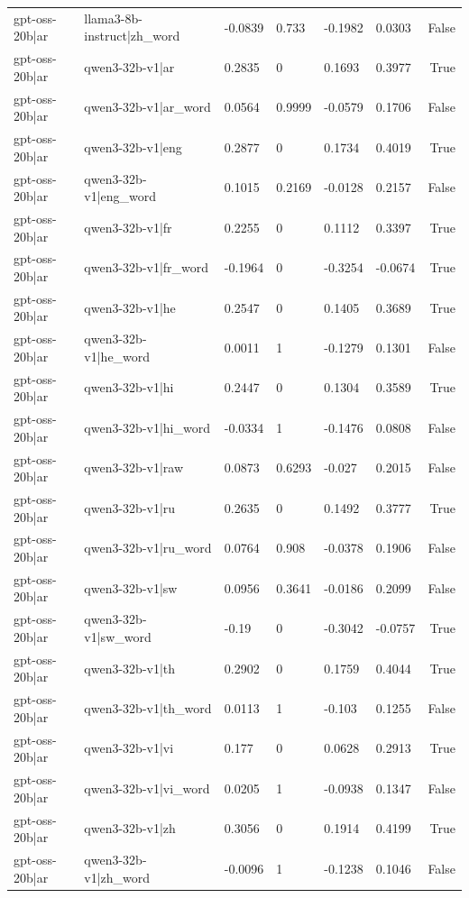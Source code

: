 \begin{table}
\begin{tabular}{llllllr}
gpt-oss-20b|ar & llama3-8b-instruct|zh_word & -0.0839 & 0.733 & -0.1982 & 0.0303 & False \\
gpt-oss-20b|ar & qwen3-32b-v1|ar & 0.2835 & 0 & 0.1693 & 0.3977 & True \\
gpt-oss-20b|ar & qwen3-32b-v1|ar_word & 0.0564 & 0.9999 & -0.0579 & 0.1706 & False \\
gpt-oss-20b|ar & qwen3-32b-v1|eng & 0.2877 & 0 & 0.1734 & 0.4019 & True \\
gpt-oss-20b|ar & qwen3-32b-v1|eng_word & 0.1015 & 0.2169 & -0.0128 & 0.2157 & False \\
gpt-oss-20b|ar & qwen3-32b-v1|fr & 0.2255 & 0 & 0.1112 & 0.3397 & True \\
gpt-oss-20b|ar & qwen3-32b-v1|fr_word & -0.1964 & 0 & -0.3254 & -0.0674 & True \\
gpt-oss-20b|ar & qwen3-32b-v1|he & 0.2547 & 0 & 0.1405 & 0.3689 & True \\
gpt-oss-20b|ar & qwen3-32b-v1|he_word & 0.0011 & 1 & -0.1279 & 0.1301 & False \\
gpt-oss-20b|ar & qwen3-32b-v1|hi & 0.2447 & 0 & 0.1304 & 0.3589 & True \\
gpt-oss-20b|ar & qwen3-32b-v1|hi_word & -0.0334 & 1 & -0.1476 & 0.0808 & False \\
gpt-oss-20b|ar & qwen3-32b-v1|raw & 0.0873 & 0.6293 & -0.027 & 0.2015 & False \\
gpt-oss-20b|ar & qwen3-32b-v1|ru & 0.2635 & 0 & 0.1492 & 0.3777 & True \\
gpt-oss-20b|ar & qwen3-32b-v1|ru_word & 0.0764 & 0.908 & -0.0378 & 0.1906 & False \\
gpt-oss-20b|ar & qwen3-32b-v1|sw & 0.0956 & 0.3641 & -0.0186 & 0.2099 & False \\
gpt-oss-20b|ar & qwen3-32b-v1|sw_word & -0.19 & 0 & -0.3042 & -0.0757 & True \\
gpt-oss-20b|ar & qwen3-32b-v1|th & 0.2902 & 0 & 0.1759 & 0.4044 & True \\
gpt-oss-20b|ar & qwen3-32b-v1|th_word & 0.0113 & 1 & -0.103 & 0.1255 & False \\
gpt-oss-20b|ar & qwen3-32b-v1|vi & 0.177 & 0 & 0.0628 & 0.2913 & True \\
gpt-oss-20b|ar & qwen3-32b-v1|vi_word & 0.0205 & 1 & -0.0938 & 0.1347 & False \\
gpt-oss-20b|ar & qwen3-32b-v1|zh & 0.3056 & 0 & 0.1914 & 0.4199 & True \\
gpt-oss-20b|ar & qwen3-32b-v1|zh_word & -0.0096 & 1 & -0.1238 & 0.1046 & False \\

\end{tabular}
\end{table}
